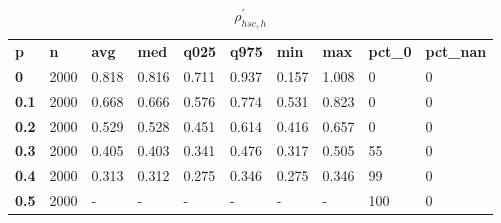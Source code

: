\begin{table}[h]
 \centering 
\footnotesize
\caption{$\rho_{hsc,h}^\prime $}
\label{tab:alphahsch}
\begin{tabular}[h]{| l l l l l l l l l l|
    } \hline
\textbf{ p} & \textbf{ n} & \textbf{ avg} & \textbf{ med} & \textbf{ q025} & \textbf{ q975} & \textbf{ min} & \textbf{ max} & \textbf{ pct\_0} & \textbf{ pct\_nan}
           \\
  \textbf{  0} & 2000 & 0.818 & 0.816 & 0.711 & 0.937 & 0.157 & 1.008 &   0 & 0
           \\
  \textbf{0.1} & 2000 & 0.668 & 0.666 & 0.576 & 0.774 & 0.531 & 0.823 &   0 & 0
           \\
  \textbf{0.2} & 2000 & 0.529 & 0.528 & 0.451 & 0.614 & 0.416 & 0.657 &   0 & 0
           \\
  \textbf{0.3} & 2000 & 0.405 & 0.403 & 0.341 & 0.476 & 0.317 & 0.505 &  55 & 0
           \\
  \textbf{0.4} & 2000 & 0.313 & 0.312 & 0.275 & 0.346 & 0.275 & 0.346 &  99 & 0
           \\
  \textbf{0.5} & 2000 & - & - & - & - & - & - & 100 & 0
           \\
 \hline \end{tabular}
 \end{table}
